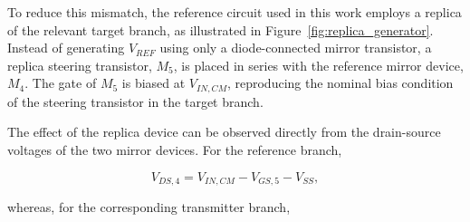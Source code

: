 To reduce this mismatch, the reference circuit used in this work employs a replica of the relevant target branch, as illustrated in Figure~\ref{fig:replica_generator}. Instead of generating $V_{REF}$ using only a diode-connected mirror transistor, a replica steering transistor, $M_5$, is placed in series with the reference mirror device, $M_4$. The gate of $M_5$ is biased at $V_{IN,CM}$, reproducing the nominal bias condition of the steering transistor in the target branch.




The effect of the replica device can be observed directly from the drain-source voltages of the two mirror devices. For the reference branch,

\begin{equation}
    V_{DS,4}
    = V_{IN,CM}-V_{GS,5}-V_{SS},
\end{equation}

whereas, for the corresponding transmitter branch,

